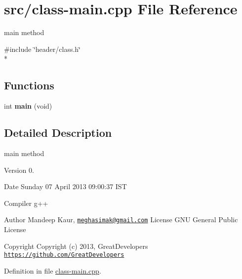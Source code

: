 \hypertarget{class-main_8cpp}{\section{src/class-\/main.cpp File Reference}
\label{class-main_8cpp}
}


main method  


{\ttfamily \#include \char`\"{}header/class.\-h\char`\"{}}\\*
\subsection*{Functions}
\begin{DoxyCompactItemize}
\item 
\hypertarget{class-main_8cpp_a840291bc02cba5474a4cb46a9b9566fe}{int {\bfseries main} (void)}\label{class-main_8cpp_a840291bc02cba5474a4cb46a9b9566fe}

\end{DoxyCompactItemize}


\subsection{Detailed Description}
main method \begin{DoxyVersion}{Version}
0. 
\end{DoxyVersion}
\begin{DoxyDate}{Date}
Sunday 07 April 2013 09\-:00\-:37 I\-S\-T\par
 Compiler g++
\end{DoxyDate}
\begin{DoxyAuthor}{Author}
Mandeep Kaur, \href{mailto:meghasimak@gmail.com}{\tt meghasimak@gmail.\-com} License G\-N\-U General Public License 
\end{DoxyAuthor}
\begin{DoxyCopyright}{Copyright}
Copyright (c) 2013, Great\-Developers \href{https://github.com/GreatDevelopers}{\tt https\-://github.\-com/\-Great\-Developers} 
\end{DoxyCopyright}


Definition in file \hyperlink{class-main_8cpp_source}{class-\/main.\-cpp}.


